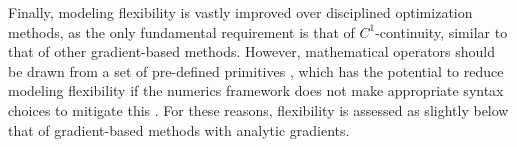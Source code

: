 \documentclass[12pt,vi,oneside,table]{report}
\begin{document}
\begin{appendices}
        Finally, modeling flexibility is vastly improved over disciplined optimization methods, as the only fundamental requirement is that of $C^1$-continuity, similar to that of other gradient-based methods. However, mathematical operators should be drawn from a set of pre-defined primitives \cite{ rackauckas_generalizing_2021}, which has the potential to reduce modeling flexibility if the numerics framework does not make appropriate syntax choices to mitigate this \cite{jax}. For these reasons, flexibility is assessed as slightly below that of gradient-based methods with analytic gradients.

    \end{appendices}

    \clearpage %
    
    
\end{document}
